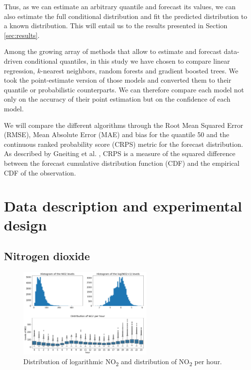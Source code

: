 \documentclass[a4paper,3p,sort&compress]{elsarticle}
\begin{document}
Thus, as we can estimate an arbitrary quantile and forecast its
values, we can also estimate the full conditional distribution and fit 
the predicted distribution to a known distribution. This
will entail us to the results presented in Section \ref{sec:results}.

Among the growing array of methods that allow to estimate and forecast
data-driven conditional quantiles, in this study we have chosen to
compare linear regression, $k$-nearest neighbors, random forests and
gradient boosted trees. We took the point-estimate version of those
models and converted them to their quantile or probabilistic
counterparts. We can therefore compare each model not only on the
accuracy of their point estimation but on the confidence of each
model.

We will compare the different algorithms through the Root Mean Squared Error (RMSE), 
Mean Absolute Error (MAE) and
bias for the quantile 50 and the continuous ranked probability score
 (CRPS) metric for the forecast
distribution.  As described by Gneiting et
al. \cite{gneiting_probabilistic_2014}, CRPS is a measure of the
squared difference between the forecast cumulative distribution
function (CDF) and the empirical CDF of the observation.

\section{Data description and experimental design}

\subsection{Nitrogen dioxide}
\label{sec:no2}

\begin{figure}
  \centering
  \includegraphics[width=0.6\textwidth]{histo_variance}
  \caption{\label{figure:histo_variance}Distribution of logarithmic
    NO\textsubscript{2} and distribution of NO\textsubscript{2}
    per hour.}
\end{figure}
\end{document}
